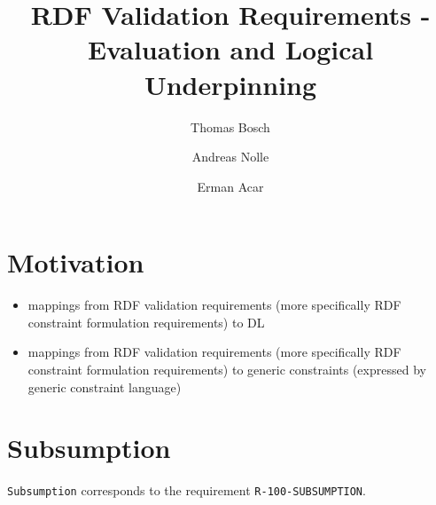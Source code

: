 \documentclass{llncs}
\newcommand{\ms}[1]{\texttt{#1}}
\begin{document}
%
%
\title{RDF Validation Requirements - Evaluation and Logical Underpinning}
\subtitle{}
%
%
\author{Thomas Bosch \and Andreas Nolle \and Erman Acar}
%
%

\maketitle              %

\begin{abstract}


\end{abstract}
%


\section{Motivation}

\begin{itemize}
	\item mappings from RDF validation requirements (more specifically RDF constraint formulation requirements) to DL
	\item mappings from RDF validation requirements (more specifically RDF constraint formulation requirements) to generic constraints (expressed by generic constraint language)
\end{itemize}

\section{Subsumption}

\ms{Subsumption} corresponds to the requirement \ms{R-100-SUBSUMPTION}.
\end{document}
